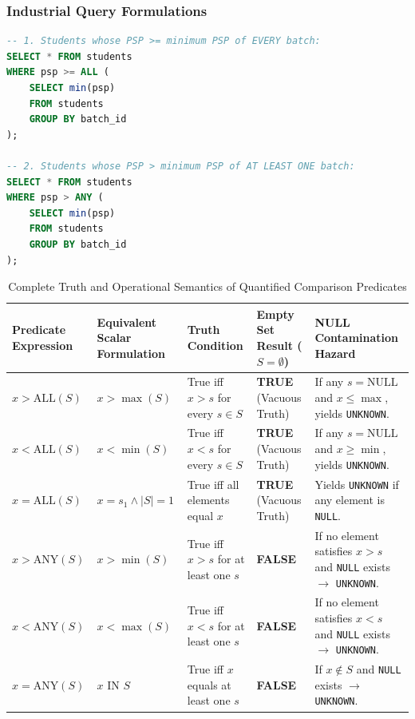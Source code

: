 \documentclass[10pt,twocolumn,letterpaper]{article}
\begin{document}
\subsubsection{Industrial Query Formulations}
\begin{lstlisting}[language=SQL]
-- 1. Students whose PSP >= minimum PSP of EVERY batch:
SELECT * FROM students
WHERE psp >= ALL (
    SELECT min(psp) 
    FROM students 
    GROUP BY batch_id
);

-- 2. Students whose PSP > minimum PSP of AT LEAST ONE batch:
SELECT * FROM students
WHERE psp > ANY (
    SELECT min(psp) 
    FROM students 
    GROUP BY batch_id
);
\end{lstlisting}

\begin{table}[htbp]
\caption{Complete Truth and Operational Semantics of Quantified Comparison Predicates}
\label{tab:quantified_truth}
\centering
\scriptsize
\begin{tabular}{p{2.6cm}p{3.2cm}p{3.0cm}p{3.0cm}p{3.2cm}}
\toprule
\textbf{Predicate Expression} & \textbf{Equivalent Scalar Formulation} & \textbf{Truth Condition} & \textbf{Empty Set Result ($S = \emptyset$)} & \textbf{NULL Contamination Hazard} \\
\midrule
$x > \text{ALL}(S)$ & $x > \max(S)$ & True iff $x > s$ for every $s \in S$ & \textbf{TRUE} (Vacuous Truth) & If any $s = \text{NULL}$ and $x \le \max$, yields \texttt{UNKNOWN}. \\
$x < \text{ALL}(S)$ & $x < \min(S)$ & True iff $x < s$ for every $s \in S$ & \textbf{TRUE} (Vacuous Truth) & If any $s = \text{NULL}$ and $x \ge \min$, yields \texttt{UNKNOWN}. \\
$x = \text{ALL}(S)$ & $x = s_1 \land |S| = 1$ & True iff all elements equal $x$ & \textbf{TRUE} (Vacuous Truth) & Yields \texttt{UNKNOWN} if any element is \texttt{NULL}. \\
\midrule
$x > \text{ANY}(S)$ & $x > \min(S)$ & True iff $x > s$ for at least one $s$ & \textbf{FALSE} & If no element satisfies $x > s$ and \texttt{NULL} exists $\to$ \texttt{UNKNOWN}. \\
$x < \text{ANY}(S)$ & $x < \max(S)$ & True iff $x < s$ for at least one $s$ & \textbf{FALSE} & If no element satisfies $x < s$ and \texttt{NULL} exists $\to$ \texttt{UNKNOWN}. \\
$x = \text{ANY}(S)$ & $x \text{ IN } S$ & True iff $x$ equals at least one $s$ & \textbf{FALSE} & If $x \notin S$ and \texttt{NULL} exists $\to$ \texttt{UNKNOWN}. \\
\bottomrule
\end{tabular}
\end{table}
\end{document}
